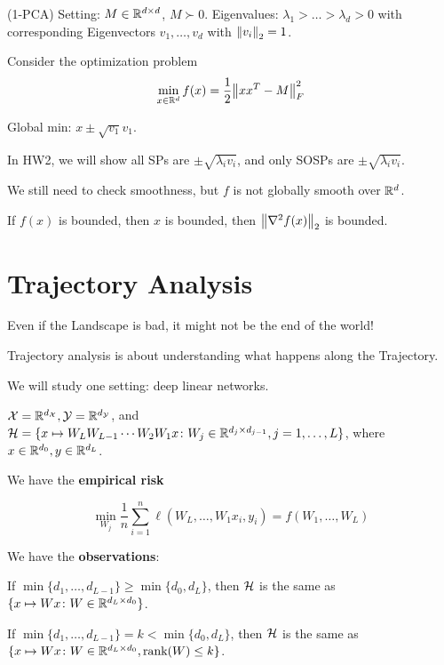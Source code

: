\begin{eg} (1-PCA)
    Setting: \(M \in \mathbb{R}^{d \times d}\), \(M \succ 0\). Eigenvalues: \(\lambda_1 > \ldots > \lambda_d > 0\)
    with corresponding Eigenvectors \(v_1, \ldots, v_d\) with \(\norm{v_i}_2 = 1\). 

    Consider the optimization problem 
    \[
        \min_{x \in \mathbb{R}^d} f(x) = \frac{1}{2} \norm{x x^T - M}_F^2
    \]

    Global min:  \(x \pm \sqrt{v_1} v_1\). 

    In HW2, we will show all SPs are \(\pm \sqrt{\lambda_i v_i}\), and only SOSPs are 
    \(\pm \sqrt{\lambda_i v_i}\). 
\end{eg}

\begin{remark}
    We still need to check smoothness, but \(f\) is not globally smooth over \(\mathbb{R}^d\). 

    If \(f(x)\) is bounded, then \(x\) is bounded, then \(\norm{\nabla^2 f(x)}_2\) is bounded. 
\end{remark}


\section{Trajectory Analysis}

Even if the Landscape is bad, it might not be the end of the world!

Trajectory analysis is about understanding what happens along the Trajectory. 

We will study one setting: deep linear networks. 

\(\mathcal{X} = \mathbb{R}^{d_{\mathcal{X}}}, \mathcal{Y} = \mathbb{R}^{d_{\mathcal{Y}}}\), and \(\mathcal{H} = \{ x \mapsto W_L W_{L-1} \cdots W_2 
W_1 x \colon W_j \in \mathbb{R}^{d_{j} \times d_{j-1}}, j = 1, \ldots, L\}\), where \(x \in \mathbb{R}^{d_0},
y \in \mathbb{R}^{d_L}\). 


We have the \textbf{empirical risk} 

\[
   \min_{W_j} \frac{1}{n} \sum_{i=1}^n \ell (W_L, \ldots, W_1 x_i, y_i) = f(W_1, \ldots, W_L)
\]

We have the \textbf{observations}: 

If \(\min \{ d_1, \ldots, d_{L-1}\} \geq \min \{ d_0, d_L\}\), then \(\mathcal{H}\) is the same 
as \(\{ x \mapsto Wx \colon W \in \mathbb{R}^{d_L \times d_0} \}\). 

If \(\min \{ d_1, \ldots, d_{L-1}\} = k < \min \{ d_0, d_L\}\), then \(\mathcal{H}\) is the same 
as \(\{ x \mapsto Wx \colon W \in \mathbb{R}^{d_L \times d_0}, \text{rank}(W) \leq k \}\).

